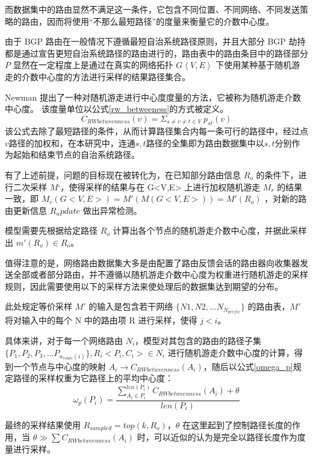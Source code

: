 而数据集中的路由显然不满足这一条件，它包含不同位置、不同网络、不同发送策略的路由，因而将使用“不那么最短路径”的度量来衡量它的介数中心度。

由于 BGP 路由在一般情况下遵循最短自治系统路径原则，并且大部分 BGP 劫持都是通过宣告更短自治系统路径的路由进行的，路由表中的路由条目中的路径部分 $P$ 显然在一定程度上是通过在真实的网络拓扑 $G \left\langle V,E \right\rangle$ 下使用某种基于随机游走的介数中心度的方法进行采样的结果路径集合。

Newman 提出了一种对随机游走进行中心度度量的方法，它被称为随机游走介数中心度。  该度量单位以公式\ref{rw_betweeness}的方式被定义。
\begin{equation} \label{rw_betweeness}
C_{RWbetweenness}(v) = \Sigma_{s \neq v \neq t \in V}\ p_{st}(v)
\end{equation}
该公式去除了最短路径的条件，从而计算路径集合内每一条可行的路径中，经过点$v$路径的加权和，在本研究中，连通$s,t$路径的全集即为路由数据集中以$s,t$分别作为起始和结束节点的自治系统路径。

有了上述前提，问题的目标现在被转化为，在已知部分路由信息 $R_o$ 的条件下，进行二次采样 $M‘$，使得采样的结果与在 G<V,E> 上进行加权随机游走 $M_r$ 的结果一致，即 $M_r(G<V,E>) = M'(M(G<V,E>)) = M'(R_o)$ ，对新的路由更新信息 $R_update$ 做出异常检测。

模型需要先根据给定路径 $R_o$ 计算出各个节点的随机游走介数中心度，并据此采样出 $m'(R_o) \in R_o$。

值得注意的是，网络路由数据集大多是由配置了路由反馈会话的路由器向收集器发送全部或者部分路由，并不遵循以随机游走介数中心度为权重进行随机游走的采样规则，因此需要使用以下的采样方法来使处理后的数据集达到期望的分布。

此处规定等价采样 $M'$ 的输入是包含若干网络 $\{N1,N2,...N_{N_{prefix}}\}$ 的路由表，$M'$ 将对输入中的每个 N 中的路由项 R 进行采样，使得 $j < i$。

具体来讲，对于每一个网络路由 $N_i$，模型对其包含的路由的路径子集 $\{P_1, P_2, P_3, ... P_{n_{route}(i)}\}, R_i<P_i, C_i> \in N_i $ 进行随机游走介数中心度的计算，得到一个节点与中心度的映射 $A_i \rightarrow C_{RWbetweenness}(A_i)$，随后以公式\ref{omega_p}规定路径的采样权重为它路径上的平均中心度：
\begin{equation} \label{omega_p}
\omega_p(P_i) = \frac{\sum_{A_i \in P_i}^{len(P_i)} C_{RWbetweenness}(A_i) + \theta}{len(P_i)}
\end{equation}

最终的采样结果使用 $R_{sampled} = top(k, R_o)$，$\theta$ 在这里起到了控制路径长度的作用，当 $\theta \gg \sum C_{RWbetweenness}(A_i) $ 时，可以近似的认为是完全以路径长度作为度量进行采样。

